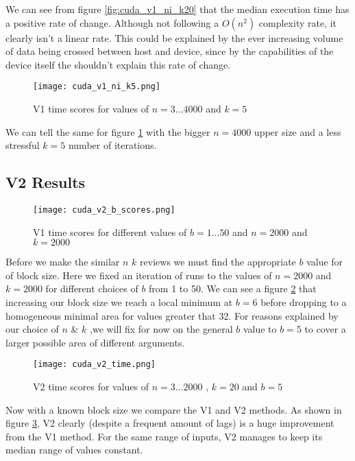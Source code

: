 \documentclass[twocolumn]{article}
\begin{document}
We can see from figure \ref{fig:cuda_v1_ni_k20} that the median execution time has a positive rate of change. Although not following a $O(n^2)$ complexity rate, it clearly isn't a linear rate. This could be explained by the ever increasing volume of data being crossed between host and device, since by the capabilities of the device itself the shouldn't explain this rate of change.

\begin{figure}[htbp]
    \centering
    \texttt{[image: cuda\_v1\_ni\_k5.png]}
    \caption{V1 time scores for values of $n = 3 \dots 4000 $ and $k = 5$ }
    \label{fig:cuda_v1_ni_k5}
\end{figure}

We can tell the same for figure \ref{fig:cuda_v1_ni_k5} with the bigger $n = 4000$ upper size and a less stressful $k = 5$ number of iterations.

\subsection{V2 Results}

\begin{figure}[htbp]
    \centering
    \texttt{[image: cuda\_v2\_b\_scores.png]}
    \caption{V1 time scores for different values of $b = 1 \dots 50$ and $n = 2000 $ and $k = 2000$ }
    \label{fig:cuda_v2_b_scores}
\end{figure}

Before we make the similar $n$ $k$ reviews we must find the appropriate $b$ value for of block size. Here we fixed an iteration of runs to the values of $n = 2000$ and $k = 2000$ for different choices of $b$ from 1 to 50. We can see a figure \ref{fig:cuda_v2_b_scores} that increasing our block size we reach a local minimum at $b = 6$ before dropping to a homogeneous minimal area for values greater that 32. For reasons explained by our choice of $n$ \& $k$ ,we will fix for now on the general $b$ value to $b = 5$ to cover a larger possible area of different arguments.

\begin{figure}[htbp]
    \centering
    \texttt{[image: cuda\_v2\_time.png]}
    \caption{V2 time scores for values of $n = 3 \dots 2000 $ , $k = 20$ and $b = 5$ }
    \label{fig:cuda_v2_time}
\end{figure}

Now with a known block size we compare the V1 and V2 methods. As shown in figure \ref{fig:cuda_v2_time}, V2 clearly (despite a frequent amount of lags) is a huge improvement from the V1 method. For the same range of inputs, V2 manages to keep its median range of values constant.
\end{document}
